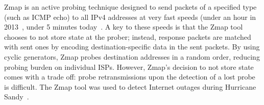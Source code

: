 Zmap is an active probing technique designed to send packets of a
specified type (such as ICMP echo) to all IPv4 addresses at
very fast speeds (under an hour in 2013~\cite{durumeric2013zmap},
under 5 minutes today~\cite{zippier-zmap}. A key to these speeds is that the
Zmap tool chooses to not store state at the prober; instead, response
packets are matched with sent ones by encoding destination-specific data
in the sent packets. By using cyclic generators, Zmap probes
destination addresses in a random order, reducing probing burden on
individual ISPs. However, Zmap's decision to not store state comes
with a trade off: probe retransmissions upon the detection of a lost
probe is difficult. The Zmap
tool was used to detect Internet outages during Hurricane
Sandy~\cite{durumeric2013zmap}. %






